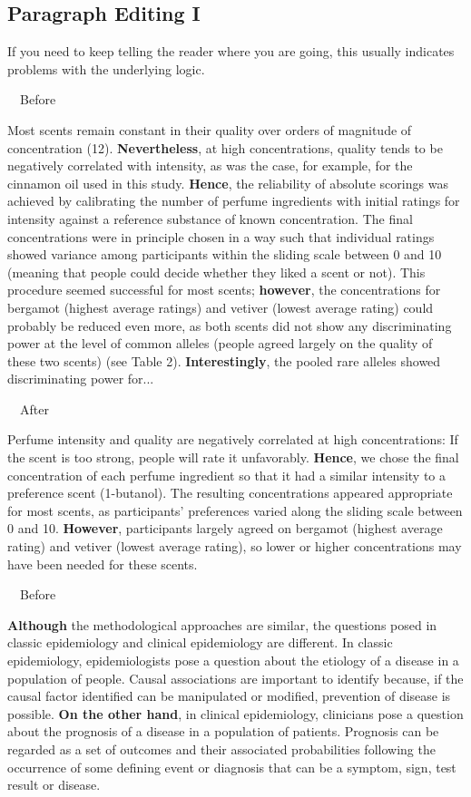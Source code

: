 \documentclass[a4paper, 12pt]{article}
\begin{document}
\newpage\subsection{Paragraph Editing I}

If you need to keep telling the reader where you are going, this usually indicates problems with the underlying logic.

\par\ \textbullet\ Before
\par Most scents remain constant in their quality over orders of magnitude of concentration (12). 
\textbf{Nevertheless}, at high concentrations, quality tends to be negatively correlated with intensity, as was the case, 
for example, for the cinnamon oil used in this study.
\textbf{Hence}, the reliability of absolute scorings was achieved by calibrating the number of perfume ingredients with initial ratings for intensity against a reference substance of known concentration. The final concentrations were in principle chosen in a way such that individual ratings showed variance among participants within the sliding scale between 0 and 10 (meaning that people could decide whether they liked a scent or not). 
This procedure seemed successful for most scents;
\textbf{however}, the concentrations for bergamot (highest average ratings) and vetiver (lowest average rating) could probably be reduced even more, as both scents did not show any discriminating power at the level of common alleles (people agreed largely on the quality of these two scents) (see Table 2). 
\textbf{Interestingly}, the pooled rare alleles showed discriminating power for...

\par\ \textbullet\ After
\par Perfume intensity and quality are negatively correlated at high concentrations:
If the scent is too strong, people will rate it unfavorably.
\textbf{Hence}, we chose the final concentration of each perfume ingredient so that it had a similar intensity to a preference scent (1-butanol).
The resulting concentrations appeared appropriate for most scents, as participants' preferences varied along the sliding scale between 0 and 10.
\textbf{However}, participants largely agreed on bergamot (highest average rating) and vetiver (lowest average rating),
so lower or higher concentrations may have been needed for these scents.

\newpage\par\ \textbullet\ Before
\par \textbf{Although} the methodological approaches are similar, the questions posed in classic epidemiology and clinical epidemiology are different.
In classic epidemiology, epidemiologists pose a question about the etiology of a disease in a population of people.
Causal associations are important to identify because, if the causal factor identified can be manipulated or modified, prevention of disease is possible.
\textbf{On the other hand}, in clinical epidemiology, clinicians pose a question about the prognosis of a disease in a population of patients. Prognosis can be regarded as a set of outcomes and their associated probabilities following the occurrence of some defining event or diagnosis that can be a symptom, sign, test result or disease.
\end{document}
